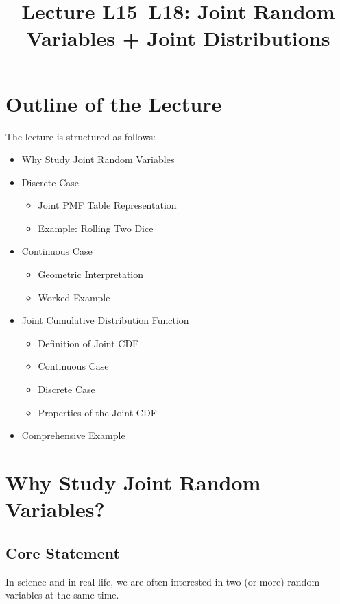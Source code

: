 \documentclass[12pt]{article}
\begin{document}
\title{Lecture L15--L18: Joint Random Variables + Joint Distributions}
\date{}
\maketitle

\section{Outline of the Lecture}

The lecture is structured as follows:

\begin{itemize}
\item Why Study Joint Random Variables
\item Discrete Case
\begin{itemize}
\item Joint PMF Table Representation
\item Example: Rolling Two Dice
\end{itemize}
\item Continuous Case
\begin{itemize}
\item Geometric Interpretation
\item Worked Example
\end{itemize}
\item Joint Cumulative Distribution Function
\begin{itemize}
\item Definition of Joint CDF
\item Continuous Case
\item Discrete Case
\item Properties of the Joint CDF
\end{itemize}
\item Comprehensive Example
\end{itemize}

\section{Why Study Joint Random Variables?}

\subsection{Core Statement}

In science and in real life, we are often interested in two (or more) random variables at the same time.
\end{document}
